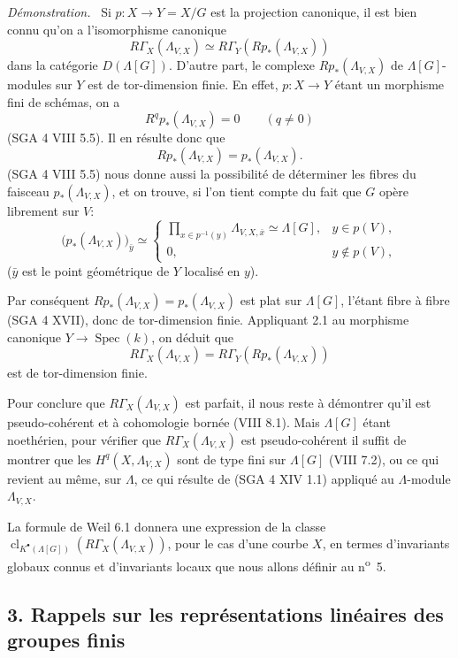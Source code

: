 \documentclass[11pt]{article}
\newenvironment{prooftext}[1][Proof]{\par\noindent\emph{#1.}\ }{\par\medskip}
\DeclareMathOperator{\Spec}{Spec}
\providecommand{\Spec}{\operatorname{Spec}}
\providecommand{\Spec}{\operatorname{Spec}}
\providecommand{\Spec}{\operatorname{Spec}}
\providecommand{\Spec}{\operatorname{Spec}}
\begin{document}
\begin{prooftext}[Démonstration]
Si $p:X\to Y=X/G$ est la projection canonique, il est bien connu qu'on a l'isomorphisme canonique
\[
R\Gamma_X(\Lambda_{V,X})\simeq R\Gamma_Y(Rp_*(\Lambda_{V,X}))
\]
dans la catégorie $D(\Lambda[G])$. D'autre part, le complexe $Rp_*(\Lambda_{V,X})$ de $\Lambda[G]$-modules sur $Y$ est de tor-dimension finie. En effet, $p:X\to Y$ étant un morphisme fini de schémas, on a
\[
R^q p_*(\Lambda_{V,X})=0\qquad(q\ne0)
\]
(SGA 4 VIII 5.5). Il en résulte donc que
\[
Rp_*(\Lambda_{V,X})=p_*(\Lambda_{V,X}).
\]
(SGA 4 VIII 5.5) nous donne aussi la possibilité de déterminer les fibres du faisceau $p_*(\Lambda_{V,X})$, et on trouve, si l'on tient compte du fait que $G$ opère librement sur $V$:
\[
\bigl(p_*(\Lambda_{V,X})\bigr)_{\bar y}\simeq
\begin{cases}
\displaystyle \prod_{x\in p^{-1}(y)}\Lambda_{V,X,\bar x}\simeq \Lambda[G],& y\in p(V),\\[1em]
0,& y\notin p(V),
\end{cases}
\]
($\bar y$ est le point géométrique de $Y$ localisé en $y$).

Par conséquent $Rp_*(\Lambda_{V,X})=p_*(\Lambda_{V,X})$ est plat sur $\Lambda[G]$, l'étant fibre à fibre (SGA 4 XVII), donc de tor-dimension finie. Appliquant 2.1 au morphisme canonique $Y\to\Spec(k)$, on déduit que
\[
R\Gamma_X(\Lambda_{V,X})=R\Gamma_Y(Rp_*(\Lambda_{V,X}))
\]
est de tor-dimension finie.

Pour conclure que $R\Gamma_X(\Lambda_{V,X})$ est parfait, il nous reste à démontrer qu'il est pseudo-cohérent et à cohomologie bornée (VIII 8.1). Mais $\Lambda[G]$ étant noethérien, pour vérifier que $R\Gamma_X(\Lambda_{V,X})$ est pseudo-cohérent il suffit de montrer que les $H^q(X,\Lambda_{V,X})$ sont de type fini sur $\Lambda[G]$ (VIII 7.2), ou ce qui revient au même, sur $\Lambda$, ce qui résulte de (SGA 4 XIV 1.1) appliqué au $\Lambda$-module $\Lambda_{V,X}$.
\end{prooftext}

La formule de Weil 6.1 donnera une expression de la classe $\operatorname{cl}_{K^\bullet(\Lambda[G])}(R\Gamma_X(\Lambda_{V,X}))$, pour le cas d'une courbe $X$, en termes d'invariants globaux connus et d'invariants locaux que nous allons définir au n\textsuperscript{o}~5.

\subsection*{3. Rappels sur les représentations linéaires des groupes finis}
\end{document}
